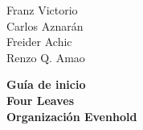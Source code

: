\begin{titlepage}
	\raggedleft 						%
	\vspace*{\baselineskip}	%
	
	{\Large
		Franz Victorio	\\
		Carlos Aznarán	\\
		Freider Achic		\\
		Renzo Q. Amao		\\
	}\vspace*{0.167\textheight}

	\bfseries{\LARGE Guía de inicio }\\[\baselineskip]
	
	{{\Huge Four Leaves}}\\[\baselineskip]
	
	\large Organización	\vfill	Evenhold

	\vspace{3\baselineskip} %
	
\end{titlepage}